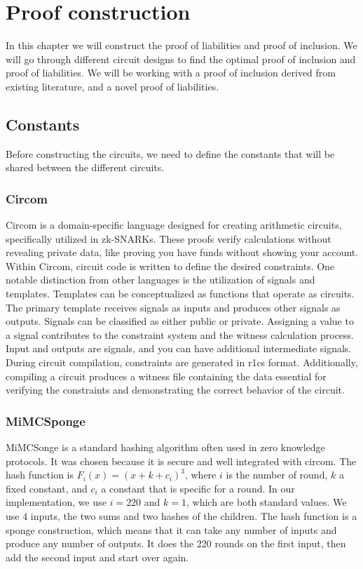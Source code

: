 
\chapter{Proof construction}
In this chapter we will construct the proof of liabilities and proof of inclusion. We will go through different circuit designs to find the optimal proof of inclusion and proof of liabilities.
We will be working with a proof of inclusion derived from existing literature, and a novel proof of liabilities.

\section{Constants}
Before constructing the circuits, we need to define the constants that will be shared between the
different circuits.


\subsection{Circom} 

Circom is a domain-specific language designed for creating arithmetic circuits, specifically utilized in zk-SNARKs. These proofs verify calculations without revealing private data, like proving you have funds without showing your account.
Within Circom, circuit code is written to define the desired constraints. One notable distinction from other languages is the utilization of signals and templates.
Templates can be conceptualized as functions that operate as circuits. The primary template receives signals as inputs and produces other signals as outputs. Signals can be classified as either public or private.
Assigning a value to a signal contributes to the constraint system and the witness calculation process.
Input and outputs are signals, and you can have additional intermediate signals.
During circuit compilation, constraints are generated in r1cs format. Additionally, compiling a circuit produces a witness file containing the data essential for verifying the constraints and demonstrating the correct behavior of the circuit.


\subsection{MiMCSponge} 
MiMCSonge is a standard hashing algorithm often used in zero knowledge protocols. It was chosen because it is secure and well integrated with circom.
The hash function is $F_i(x) = (x + k + c_i)^3$, where $i$ is the number of round, $k$ a fixed constant, and $c_i$ a constant that is specific for a round.
In our implementation, we use $i = 220$ and $k = 1$, which are both standard values. We use 4 inputs, the two sums and two hashes of the children. 
The hash function is a sponge construction, which means that it can take any number of inputs and produce any number of outputs. It does the 220 rounds on the first input, then add the second input and start over again.

